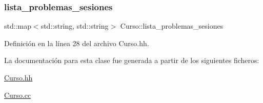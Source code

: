 \subsubsection{\texorpdfstring{lista\+\_\+problemas\+\_\+sesiones}{lista\_problemas\_sesiones}}
{\footnotesize\ttfamily std\+::map$<$std\+::string, std\+::string$>$ Curso\+::lista\+\_\+problemas\+\_\+sesiones\hspace{0.3cm}{\ttfamily [private]}}



Definición en la línea 28 del archivo Curso.\+hh.



La documentación para esta clase fue generada a partir de los siguientes ficheros\+:\begin{DoxyCompactItemize}
\item 
\mbox{\hyperlink{_curso_8hh}{Curso.\+hh}}\item 
\mbox{\hyperlink{_curso_8cc}{Curso.\+cc}}\end{DoxyCompactItemize}
